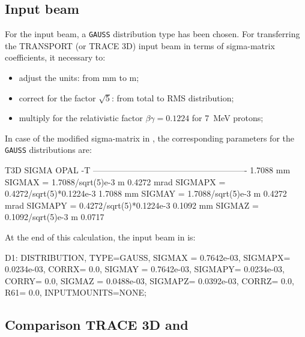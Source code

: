 \subsection{\opalt Input beam}
\label{ssec:OPAL_input}

For the input beam, a \texttt{GAUSS} distribution type has been chosen.  For transferring the TRANSPORT (or TRACE 3D) input beam in terms of sigma-matrix coefficients, it necessary to:

\begin{itemize}
\item  adjust the units: from mm to m;
\item correct for the factor $\sqrt{5}$: from total to RMS distribution;
\item multiply for the relativistic factor $\beta\gamma =\num{0.1224}$ for \SI{7}{\mega\electronvolt} protons;
\end{itemize}

 In case of the modified sigma-matrix in , the corresponding \opal parameters for the \texttt{GAUSS} distributions are:

\begin{example}
 T3D SIGMA                        OPAL -T
-------------------------------------------------------
1.7088 mm             SIGMAX  = 1.7088/sqrt(5)e-3         m
0.4272 mrad           SIGMAPX = 0.4272/sqrt(5)*0.1224e-3
1.7088 mm             SIGMAY  = 1.7088/sqrt(5)e-3        m
0.4272 mrad           SIGMAPY = 0.4272/sqrt(5)*0.1224e-3
0.1092 mm             SIGMAZ  = 0.1092/sqrt(5)e-3        m
0.0717 %
\end{example}

At the end of this calculation, the input beam in \opal is:

\begin{example}
D1: DISTRIBUTION, TYPE=GAUSS,
SIGMAX = 0.7642e-03,  SIGMAPX= 0.0234e-03,  CORRX= 0.0,
SIGMAY = 0.7642e-03,  SIGMAPY= 0.0234e-03,  CORRY= 0.0,
SIGMAZ = 0.0488e-03,  SIGMAPZ= 0.0392e-03,  CORRZ= 0.0, R61= 0.0,
INPUTMOUNITS=NONE;
\end{example}


\subsection{Comparison TRACE 3D and \opalt}
\label{sec:T3D_OPAL}

